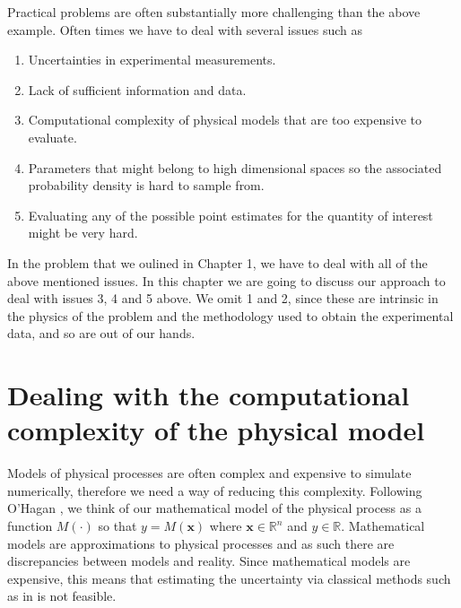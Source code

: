 \documentclass[12pt]{book}
\newcommand{\x}{\textbf{x}}
\begin{document}
Practical problems are often substantially more challenging than the above example. Often times we have to 
deal with several issues such as 

\begin{enumerate}
\item Uncertainties in experimental measurements.
\item Lack of sufficient information and data.
\item Computational complexity of  physical models that are too expensive to evaluate.
\item Parameters that might belong to high dimensional spaces so the associated probability density is 
hard to sample from.
\item Evaluating any of the possible point estimates for the quantity of interest might be very hard.
\end{enumerate}
In the problem that we oulined in  Chapter 1, we have to deal with all of  the above mentioned issues.
In this chapter we are going to discuss our approach to deal with issues 3, 4 and 5 above. We 
omit 1 and 2, since these  are intrinsic in the physics of the problem and   the methodology used 
to obtain the experimental data, and so are out of our hands.


\section{Dealing with  the computational complexity of the physical model}
Models of physical processes are often complex and   expensive to simulate numerically, therefore we need
a way of reducing this complexity.
Following O'Hagan  \cite{o2006bayesian}, we think of our  mathematical model of the physical process
 as a function
$M(\cdot)$ so that $y=M(\x)$ where $\x\in\mathbb{R}^{n}$   and $y\in\mathbb{R}$.
Mathematical models are approximations to physical processes and as such there are discrepancies between
models and reality. Since mathematical models are expensive,
this means that estimating the uncertainty via   classical methods such  as in 
\cite{saltelli2000sensitivity} is not feasible. 
\end{document}
